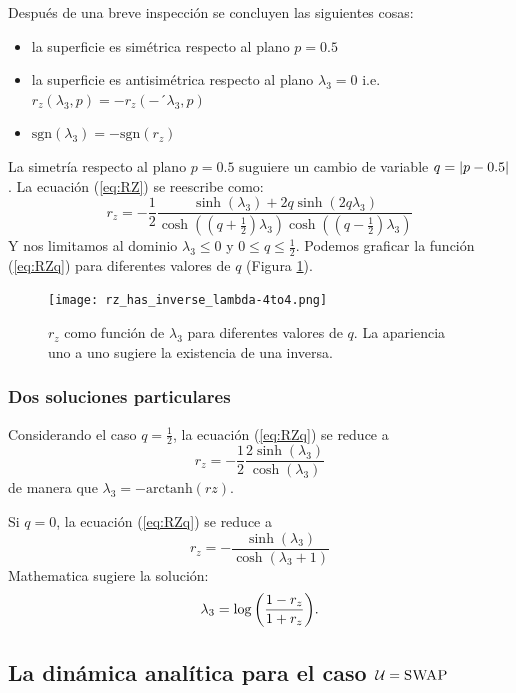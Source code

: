 Después de una breve inspección se concluyen las siguientes cosas:
\begin{itemize}
\item la superficie es simétrica respecto al plano $p=0.5$
\item la superficie es antisimétrica  respecto al plano $\lambda_{3}=0$ i.e. $r_{z
}(\lambda_{3},p)=-r_{z
}(-´\lambda_{3},p)$
\item $\text{sgn}(\lambda_{3})=-\text{sgn}(r_{z})$
\end{itemize}

La simetría respecto al plano $p=0.5$ suguiere un cambio de variable $q=\abs{p-0.5}$. La ecuación (\ref{eq:RZ}) se reescribe como:
\begin{equation}\label{eq:RZq}
r_{z}=-\frac{1}{2}\frac{\sinh(\lambda_{3})+2q\sinh(2q\lambda_{3})}{\cosh((q+\frac{1}{2})\lambda_{3})\cosh((q-\frac{1}{2})\lambda_{3})}
\end{equation}
Y nos limitamos al dominio $\lambda_{3}\leq0$ y $0\leq q\leq\frac{1}{2}$. Podemos graficar la función (\ref{eq:RZq}) para diferentes valores de $q$ (Figura \ref{fig:rzinv}).
\begin{figure}[h!]
\centering
\texttt{[image: rz\_has\_inverse\_lambda-4to4.png]}
\caption{$r_{z}$ como función de $\lambda_{3}$ para diferentes valores de $q$. La apariencia uno a uno sugiere la existencia de una inversa.}
\label{fig:rzinv}
\end{figure}
\subsubsection{Dos soluciones particulares}

Considerando el caso $q=\frac{1}{2}$, la ecuación (\ref{eq:RZq}) se reduce a 
\begin{equation}
r_z=-\frac{1}{2}\frac{2\sinh(\lambda_{3})}{\cosh(\lambda_{3})}
\end{equation}
de manera que $\lambda_{3}=-\text{arctanh}(rz)$.

Si $q=0$, la ecuación (\ref{eq:RZq}) se reduce a
\begin{equation}
r_z=-\frac{\sinh(\lambda_{3})}{\cosh(\lambda_{3}+1)}
\end{equation}
Mathematica sugiere la solución:
\begin{equation}\label{eq:lambda0.5}
\lambda_{3}=\log\qty(\frac{1-r_{z}}{1+r_{z}}).
\end{equation}

\subsection{La dinámica analítica para el caso $\mathcal{U}=\textsc{SWAP}$}

